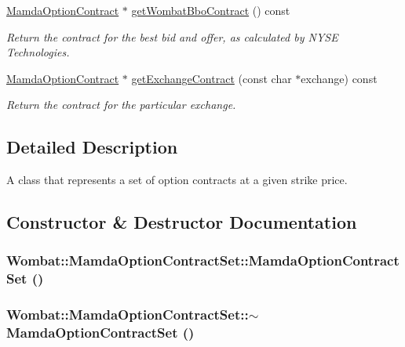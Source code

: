 \begin{CompactItemize}
\hyperlink{classWombat_1_1MamdaOptionContract}{Mamda\-Option\-Contract} $\ast$ \hyperlink{classWombat_1_1MamdaOptionContractSet_1f26638ea5009048fa21d9d6e61ace3a}{get\-Wombat\-Bbo\-Contract} () const 
\begin{CompactList}\small\item\em Return the contract for the best bid and offer, as calculated by NYSE Technologies. \item\end{CompactList}\item 
\hyperlink{classWombat_1_1MamdaOptionContract}{Mamda\-Option\-Contract} $\ast$ \hyperlink{classWombat_1_1MamdaOptionContractSet_5077c90f87d60c589172a33634f8cc2c}{get\-Exchange\-Contract} (const char $\ast$exchange) const 
\begin{CompactList}\small\item\em Return the contract for the particular exchange. \item\end{CompactList}\end{CompactItemize}


\subsection{Detailed Description}
A class that represents a set of option contracts at a given strike price. 



\subsection{Constructor \& Destructor Documentation}
\hypertarget{classWombat_1_1MamdaOptionContractSet_4d7fca2711028aea1020f1ad45bf292c}{
\subsubsection[MamdaOptionContractSet]{\setlength{\rightskip}{0pt plus 5cm}Wombat::Mamda\-Option\-Contract\-Set::Mamda\-Option\-Contract\-Set ()}}
\label{classWombat_1_1MamdaOptionContractSet_4d7fca2711028aea1020f1ad45bf292c}


\hypertarget{classWombat_1_1MamdaOptionContractSet_b936965d38c1d42183634eb785276a67}{
\subsubsection[$\sim$MamdaOptionContractSet]{\setlength{\rightskip}{0pt plus 5cm}Wombat::Mamda\-Option\-Contract\-Set::$\sim$Mamda\-Option\-Contract\-Set ()}}
\label{classWombat_1_1MamdaOptionContractSet_b936965d38c1d42183634eb785276a67}




